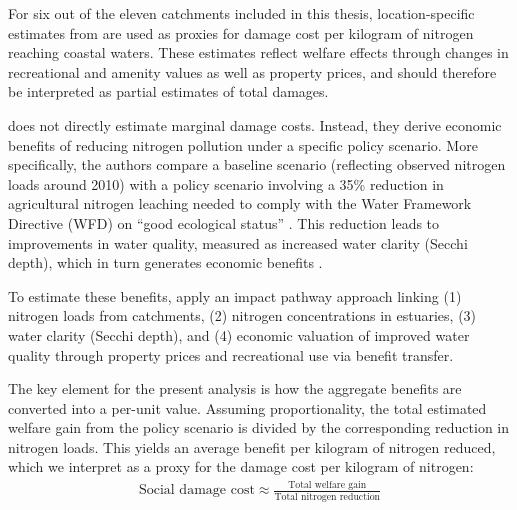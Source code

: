 \documentclass[12pt]{article}
\begin{document}
\label{sec:specific-valuation-approach}

For six out of the eleven catchments included in this thesis, location-specific estimates from \citet{andersen2019} are used as proxies for damage cost per kilogram of nitrogen reaching coastal waters. These estimates reflect welfare effects through changes in recreational and amenity values as well as property prices, and should therefore be interpreted as partial estimates of total damages.

\cite{andersen2019} does not directly estimate marginal damage costs. Instead, they derive economic benefits of reducing nitrogen pollution under a specific policy scenario. More specifically, the authors compare a baseline scenario (reflecting observed nitrogen loads around 2010) with a policy scenario involving a 35\% reduction in agricultural nitrogen leaching needed to comply with the Water Framework Directive (WFD) on “good ecological status” \citep{andersen2019}. This reduction leads to improvements in water quality, measured as increased water clarity (Secchi depth), which in turn generates economic benefits \citep{andersen2019}.




To estimate these benefits, \cite{andersen2019} apply an impact pathway approach linking (1) nitrogen loads from catchments, (2) nitrogen concentrations in estuaries, (3) water clarity (Secchi depth), and (4) economic valuation of improved water quality through property prices and recreational use via benefit transfer.



The key element for the present analysis is how the aggregate benefits are converted into a per-unit value. Assuming proportionality, the total estimated welfare gain from the policy scenario is divided by the corresponding reduction in nitrogen loads. This yields an average benefit per kilogram of nitrogen reduced, which we interpret as a proxy for the damage cost per kilogram of nitrogen:
\begin{align*}
    \text{Social damage cost} \approx \frac{\text{Total welfare gain}}{\text{Total nitrogen reduction}}
\end{align*}
\end{document}
